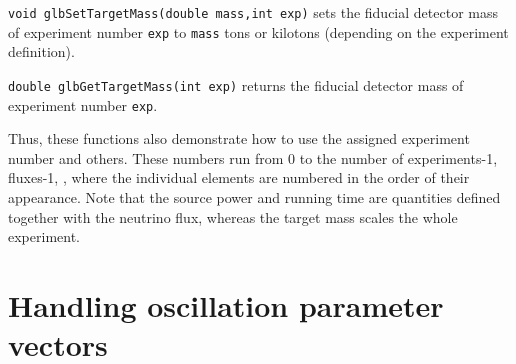 \begin{function}
{\tt void glbSetTargetMass(double mass,int exp)}
sets the fiducial detector mass of experiment number {\tt exp} to {\tt mass} tons or kilotons (depending on the experiment definition).
\end{function}
\begin{function}
{\tt double glbGetTargetMass(int exp)}
returns the fiducial detector mass of experiment number {\tt exp}.
\end{function}
Thus, these functions also demonstrate how to use the assigned experiment number and others. These numbers run from $0$ to the number of experiments-1, fluxes-1, \etc, where the individual elements are numbered in the order of their appearance. 
 Note that the source power and running time are quantities defined
together with the neutrino flux, whereas the target mass scales the whole
experiment.

\section{Handling oscillation parameter vectors}

